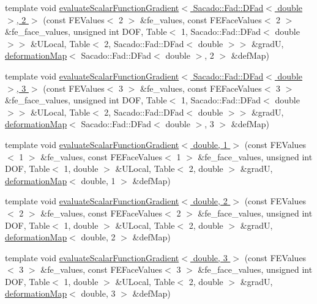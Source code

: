 \begin{DoxyCompactItemize}
\item 
template void \hyperlink{function_evaluations_8cc_afe7a628ac86500a836308f5d73763eb9}{evaluate\-Scalar\-Function\-Gradient$<$ Sacado\-::\-Fad\-::\-D\-Fad$<$ double $>$, 2 $>$} (const F\-E\-Values$<$ 2 $>$ \&fe\-\_\-values, const F\-E\-Face\-Values$<$ 2 $>$ \&fe\-\_\-face\-\_\-values, unsigned int D\-O\-F, Table$<$ 1, Sacado\-::\-Fad\-::\-D\-Fad$<$ double $>$$>$ \&U\-Local, Table$<$ 2, Sacado\-::\-Fad\-::\-D\-Fad$<$ double $>$$>$ \&grad\-U, \hyperlink{structdeformation_map}{deformation\-Map}$<$ Sacado\-::\-Fad\-::\-D\-Fad$<$ double $>$, 2 $>$ \&def\-Map)
\item 
template void \hyperlink{function_evaluations_8cc_a28b649ef8b832ed57cd596b5a68d62c2}{evaluate\-Scalar\-Function\-Gradient$<$ Sacado\-::\-Fad\-::\-D\-Fad$<$ double $>$, 3 $>$} (const F\-E\-Values$<$ 3 $>$ \&fe\-\_\-values, const F\-E\-Face\-Values$<$ 3 $>$ \&fe\-\_\-face\-\_\-values, unsigned int D\-O\-F, Table$<$ 1, Sacado\-::\-Fad\-::\-D\-Fad$<$ double $>$$>$ \&U\-Local, Table$<$ 2, Sacado\-::\-Fad\-::\-D\-Fad$<$ double $>$$>$ \&grad\-U, \hyperlink{structdeformation_map}{deformation\-Map}$<$ Sacado\-::\-Fad\-::\-D\-Fad$<$ double $>$, 3 $>$ \&def\-Map)
\item 
template void \hyperlink{function_evaluations_8cc_a089c72529f691dcdbd062a644a861a93}{evaluate\-Scalar\-Function\-Gradient$<$ double, 1 $>$} (const F\-E\-Values$<$ 1 $>$ \&fe\-\_\-values, const F\-E\-Face\-Values$<$ 1 $>$ \&fe\-\_\-face\-\_\-values, unsigned int D\-O\-F, Table$<$ 1, double $>$ \&U\-Local, Table$<$ 2, double $>$ \&grad\-U, \hyperlink{structdeformation_map}{deformation\-Map}$<$ double, 1 $>$ \&def\-Map)
\item 
template void \hyperlink{function_evaluations_8cc_ad5e8e4a735ad40906adb7a5107748ea9}{evaluate\-Scalar\-Function\-Gradient$<$ double, 2 $>$} (const F\-E\-Values$<$ 2 $>$ \&fe\-\_\-values, const F\-E\-Face\-Values$<$ 2 $>$ \&fe\-\_\-face\-\_\-values, unsigned int D\-O\-F, Table$<$ 1, double $>$ \&U\-Local, Table$<$ 2, double $>$ \&grad\-U, \hyperlink{structdeformation_map}{deformation\-Map}$<$ double, 2 $>$ \&def\-Map)
\item 
template void \hyperlink{function_evaluations_8cc_a121295365acb762462c0f9812a5fc118}{evaluate\-Scalar\-Function\-Gradient$<$ double, 3 $>$} (const F\-E\-Values$<$ 3 $>$ \&fe\-\_\-values, const F\-E\-Face\-Values$<$ 3 $>$ \&fe\-\_\-face\-\_\-values, unsigned int D\-O\-F, Table$<$ 1, double $>$ \&U\-Local, Table$<$ 2, double $>$ \&grad\-U, \hyperlink{structdeformation_map}{deformation\-Map}$<$ double, 3 $>$ \&def\-Map)

\end{DoxyCompactItemize}
